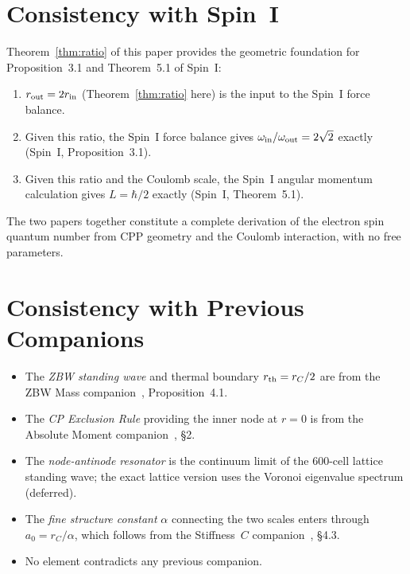 \documentclass[12pt]{article}
\newcommand{\rC}{r_C}
\newcommand{\rth}{r_{\rm th}}
\newcommand{\rin}{r_{\rm in}}
\newcommand{\rout}{r_{\rm out}}
\newcommand{\oin}{\omega_{\rm in}}
\newcommand{\oout}{\omega_{\rm out}}
\newcommand{\aBohr}{a_0}
\begin{document}
\section{Consistency with Spin~I}
\label{sec:consistency_spinI}

Theorem~\ref{thm:ratio} of this paper provides the geometric
foundation for Proposition~3.1 and Theorem~5.1 of Spin~I:

\begin{enumerate}[noitemsep]
  \item $\rout = 2\rin$ (Theorem~\ref{thm:ratio} here) is the input
    to the Spin~I force balance.
  \item Given this ratio, the Spin~I force balance gives
    $\oin/\oout = 2\sqrt{2}$ exactly (Spin~I, Proposition~3.1).
  \item Given this ratio and the Coulomb scale, the Spin~I angular
    momentum calculation gives $L = \hbar/2$ exactly (Spin~I,
    Theorem~5.1).
\end{enumerate}

The two papers together constitute a complete derivation of the
electron spin quantum number from CPP geometry and the Coulomb
interaction, with no free parameters.

\section{Consistency with Previous Companions}
\label{sec:consistency}

\begin{itemize}[noitemsep]
  \item The \emph{ZBW standing wave} and thermal boundary
    $\rth = \rC/2$ are from the ZBW Mass companion~\cite{c4},
    Proposition~4.1.
  \item The \emph{CP Exclusion Rule} providing the inner node at
    $r = 0$ is from the Absolute Moment companion~\cite{c1}, \S2.
  \item The \emph{node-antinode resonator} is the continuum limit
    of the 600-cell lattice standing wave; the exact lattice
    version uses the Voronoi eigenvalue spectrum (deferred).
  \item The \emph{fine structure constant} $\alpha$ connecting
    the two scales enters through $\aBohr = \rC/\alpha$, which
    follows from the Stiffness~$C$ companion~\cite{c2}, \S4.3.
  \item No element contradicts any previous companion.
\end{itemize}
\end{document}
